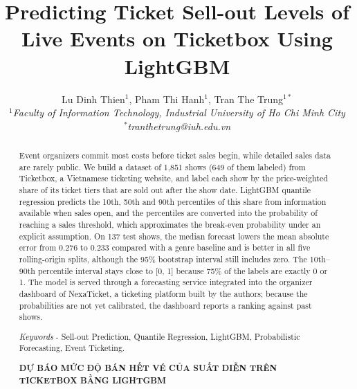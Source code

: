 \documentclass{IEEEtran}
\begin{document}
\title{Predicting Ticket Sell-out Levels of Live Events on Ticketbox Using LightGBM}

\author{Lu Dinh Thien$^{1}$, Pham Thi Hanh$^{1}$, Tran The Trung$^{1*}$\\
\textit{$^{1}$Faculty of Information Technology, Industrial University of Ho Chi Minh City}\\
\textit{$^{*}$tranthetrung@iuh.edu.vn}}

\maketitle
\renewcommand{\abstractname}{Abstract}

\begin{abstract}
Event organizers commit most costs before ticket sales begin, while detailed sales data are rarely public. We build a dataset of 1,851 shows (649 of them labeled) from Ticketbox, a Vietnamese ticketing website, and label each show by the price-weighted share of its ticket tiers that are sold out after the show date. LightGBM quantile regression predicts the 10th, 50th and 90th percentiles of this share from information available when sales open, and the percentiles are converted into the probability of reaching a sales threshold, which approximates the break-even probability under an explicit assumption. On 137 test shows, the median forecast lowers the mean absolute error from 0.276 to 0.233 compared with a genre baseline and is better in all five rolling-origin splits, although the 95\% bootstrap interval still includes zero. The 10th--90th percentile interval stays close to [0, 1] because 75\% of the labels are exactly 0 or 1. The model is served through a forecasting service integrated into the organizer dashboard of NexaTicket, a ticketing platform built by the authors; because the probabilities are not yet calibrated, the dashboard reports a ranking against past shows.

\textit{Keywords} - {\normalfont Sell-out Prediction, Quantile Regression, LightGBM, Probabilistic Forecasting, Event Ticketing.}

\vspace{6pt}
\begin{center}
\textbf{DỰ BÁO MỨC ĐỘ BÁN HẾT VÉ CỦA SUẤT DIỄN TRÊN TICKETBOX BẰNG LIGHTGBM}
\end{center}


\end{abstract}
\end{document}
